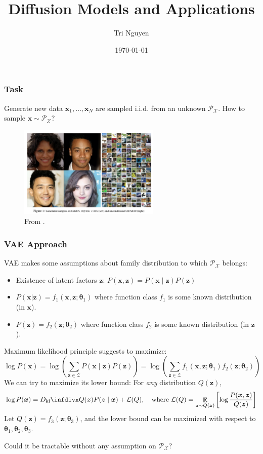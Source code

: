 \documentclass[10pt,xcolor={usenames,dvipsnames,table},aspectratio=169]{beamer}
\title[Diffusion Models]{Diffusion Models and Applications}
\author{Tri Nguyen}
\institute[OSU] 
{
    Internal Reading Meeting \\
Oregon State University 
}
\date{\today} %
\begin{document}
\frame{\titlepage}

\begin{frame}
\frametitle{Task}    
\begin{block}{Generate new data}
$\bm{x}_1, \ldots , \bm{x}_N$ are sampled i.i.d. from an unknown $\mathcal{P}_{\mathcal{X}}$. How to sample $\bm{x} \sim \mathcal{P}_{\mathcal{X}}$?
\end{block}
\begin{figure}
    \centering
    \includegraphics[width=0.6\textwidth]{figures/fake_faces.png}
    \caption{From \citep{ho2020denoising}.}
\end{figure}
\end{frame}

\begin{frame}
\frametitle{VAE Approach}
VAE \citep{kingma2013auto} makes some assumptions about family distribution to which $\mathcal{P}_{\mathcal{X}}$ belongs:
\begin{itemize}
    \item Existence of latent factors $\bm{z}$: $P(\bm{x}, \bm{z}) = P(\bm{x}\mid \bm{z}) P(\bm{z})$
    \item $P(\bm{x}|\bm{z}) = f_1(\bm{x}, \bm{z}; \boldsymbol \theta_1)$ where function class $f_1$ is some known distribution (in $\bm{x}$).
    \item $P(\bm{z}) = f_2(\bm{z}; \boldsymbol \theta_2)$ where function class $f_2$ is some known distribution (in $\bm{z}$).
\end{itemize}
Maximum likelihood principle suggests to maximize:
\[
\log P(\bm{x}) 
= \log \left( \sum_{\bm{z} \in \mathcal{Z}} P(\bm{x} \mid \bm{z}) P(\bm{z}) \right)
= \log \left( \sum_{\bm{z} \in \mathcal{Z}} f_1(\bm{x}, \bm{z}; \boldsymbol \theta_1) f_2(\bm{z}; \boldsymbol \theta_2) \right)
\] 
We can try to maximize its lower bound: For \textit{any} distribution $Q(\bm{z})$,
\[
\log P(\bm{x}) = 
\Dkl{Q(\bm{z})}{P(\bm{z} \mid \bm{x})}
+ \mathcal{L}(Q), \quad \text{where }
\mathcal{L}(Q) = \mathop{\mathbb{E}}_{\bm{z} \sim Q(\bm{z})} \left[ \log \dfrac{P(\bm{x}, \bm{z})}{Q(\bm{z})} \right]
\] 
Let $Q(\bm{z}) = f_3(\bm{z}; \boldsymbol \theta_3)$, and the lower bound can be maximized with respect to $\boldsymbol \theta_1, \boldsymbol \theta_2, \boldsymbol \theta_3$.

\begin{alertblock}{}
Could it be tractable without any assumption on $\mathcal{P}_{\mathcal{X}}$?
\end{alertblock}
\end{frame}
\end{document}
